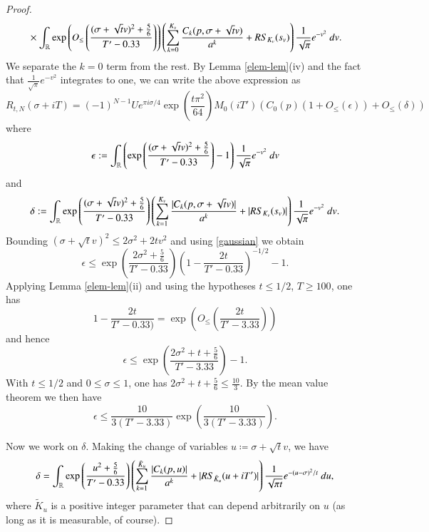 \begin{proof}
\begin{align*}
&\quad \times \int_{\mathbb{R}} \exp\left( O_{\leq}\left(\frac{(\sigma + \sqrt{t} v)^2 + \frac{5}{6}}{T'-0.33} \right) \right) \left(\sum_{k=0}^{K_v} \frac{C_k(p,\sigma + \sqrt{t} v)}{a^k} + RS_{K_v}(s_v)\right) \frac{1}{\sqrt{\pi}} e^{-v^2}\ dv.
\end{align*}
We separate the $k=0$ term from the rest.
By Lemma \ref{elem-lem}(iv) and the fact that $\frac{1}{\sqrt{\pi}} e^{-v^2}$ integrates to one, we can write the above expression as
\begin{equation}\label{rtnst}
 R_{t,N}(\sigma+iT) = (-1)^{N-1} U e^{\pi i \sigma/4} \exp\left( \frac{t \pi^2}{64}\right) M_0(iT') \left( C_0(p) (1 + O_{\leq}(\epsilon)) + O_{\leq}(\delta) \right)
\end{equation}
where
$$ \epsilon := \int_{\mathbb{R}} \left( \exp\left( \frac{(\sigma + \sqrt{t} v)^2 + \frac{5}{6} }{T'-0.33} \right)  - 1\right) \frac{1}{\sqrt{\pi}} e^{-v^2}\ dv$$
and
$$ \delta := \int_{\mathbb{R}} \exp\left( \frac{(\sigma + \sqrt{t} v)^2 + \frac{5}{6}}{T'-0.33} \right) \left(\sum_{k=1}^{K_v} \frac{|C_k(p,\sigma+\sqrt{t}v)|}{a^k} + |RS_{K_v}(s_v)|\right) \frac{1}{\sqrt{\pi}} e^{-v^2}\ dv.$$
Bounding $(\sigma + \sqrt{t} v)^2 \leq 2 \sigma^2 + 2 t v^2$ and using \eqref{gaussian} we obtain
$$ \epsilon \leq \exp\left( \frac{2\sigma^2 + \frac{5}{6}}{T'-0.33} \right) \left(1 - \frac{2t}{T'-0.33}\right)^{-1/2} - 1.$$
Applying Lemma \ref{elem-lem}(ii) and using the hypotheses $t \leq 1/2$, $T \geq 100$, one has
$$ 1 - \frac{2t}{T'-0.33)} = \exp\left( O_{\leq}\left( \frac{2t}{T'-3.33} \right)\right)$$
and hence
$$
 \epsilon \leq \exp\left( \frac{2\sigma^2 + t + \frac{5}{6}}{T'-3.33} \right) - 1.
$$
With $t \leq 1/2$ and $0 \leq \sigma \leq 1$, one has $2\sigma^2 + t + \frac{5}{6} \leq \frac{10}{3}$.  By the mean value theorem we then have
\begin{equation}\label{eep}
 \epsilon \leq \frac{10}{3(T'-3.33)} \exp\left( \frac{10}{3(T'-3.33)}\right).
\end{equation}

Now we work on $\delta$.  Making the change of variables $u \coloneqq \sigma + \sqrt{t} v$, we have
$$ \delta = \int_{\mathbb{R}} \exp\left( \frac{u^2 + \frac{5}{6}}{T'-0.33} \right) \left(\sum_{k=1}^{\tilde K_u} \frac{|C_k(p,u)|}{a^k} + |RS_{\tilde K_u}(u + iT')|\right) \frac{1}{\sqrt{\pi t}} e^{-(u-\sigma)^2/t}\ du,$$
where $\tilde K_u$ is a positive integer parameter that can depend arbitrarily on $u$ (as long as it is measurable, of course).  


\end{proof}
